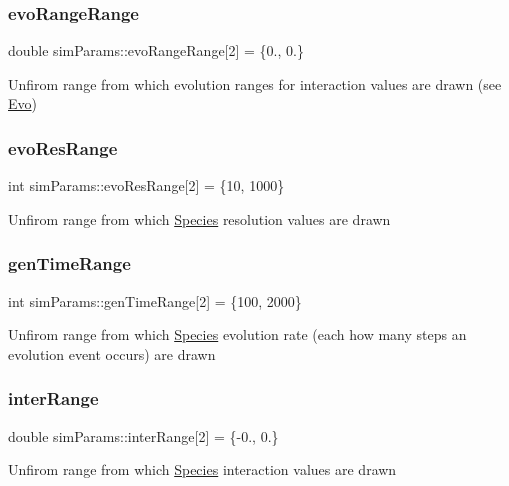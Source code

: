 \subsubsection{\texorpdfstring{evo\+Range\+Range}{evoRangeRange}}
{\footnotesize\ttfamily double sim\+Params\+::evo\+Range\+Range\mbox{[}2\mbox{]} = \{0., 0.\}}

Unfirom range from which evolution ranges for interaction values are drawn (see \hyperlink{classEvo}{Evo}) \mbox{\label{structsimParams_a4121b97ac4b40f6d309693847309ce6b}} 
\subsubsection{\texorpdfstring{evo\+Res\+Range}{evoResRange}}
{\footnotesize\ttfamily int sim\+Params\+::evo\+Res\+Range\mbox{[}2\mbox{]} = \{10, 1000\}}

Unfirom range from which \hyperlink{classSpecies}{Species} resolution values are drawn \mbox{\label{structsimParams_ace2069f1d65920fe32e4236c12e91ea9}} 
\subsubsection{\texorpdfstring{gen\+Time\+Range}{genTimeRange}}
{\footnotesize\ttfamily int sim\+Params\+::gen\+Time\+Range\mbox{[}2\mbox{]} = \{100, 2000\}}

Unfirom range from which \hyperlink{classSpecies}{Species} evolution rate (each how many steps an evolution event occurs) are drawn \mbox{\label{structsimParams_a459d8e2a902ef06f2e6ccce91a5f40bc}} 
\subsubsection{\texorpdfstring{inter\+Range}{interRange}}
{\footnotesize\ttfamily double sim\+Params\+::inter\+Range\mbox{[}2\mbox{]} = \{-\/0., 0.\}}

Unfirom range from which \hyperlink{classSpecies}{Species} interaction values are drawn \mbox{\label{structsimParams_a2114f7c6664772255e0e8afcf9334ebf}} 
